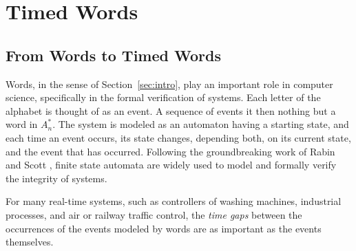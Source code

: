 \documentclass[10pt]{amsproc}
\theoremstyle{definition}
\theoremstyle{remark}
\begin{document}
\section{Timed Words}
\subsection{From Words to Timed Words}
\label{sec:timed-words}
\label{sec:words-to-timed-words}
Words, in the sense of Section~\ref{sec:intro}, play an important role in computer science, specifically in the formal verification of systems.
Each letter of the alphabet is thought of as an event.
A sequence of events it then nothing but a word in $A_n^*$.
The system is modeled as an automaton having a starting state, and each time an event occurs, its state changes, depending both, on its current state, and the event that has occurred.
Following the groundbreaking work of Rabin and Scott \cite{rabin1959finite}, finite state automata are widely used to model and formally verify the integrity of systems.

For many real-time systems, such as controllers of washing machines, industrial processes, and air or railway traffic control, the \emph{time gaps} between the occurrences of the events modeled by words are as important as the events themselves.
\end{document}
